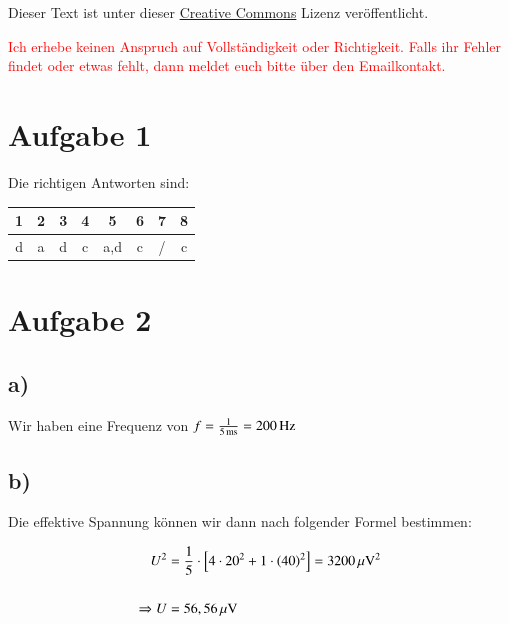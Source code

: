




\maketitle

Dieser Text ist unter dieser \href{http://creativecommons.org/licenses/by-nc-sa/4.0/}{Creative Commons} Lizenz veröffentlicht.

\textcolor{red}{Ich erhebe keinen Anspruch auf Vollständigkeit oder Richtigkeit. Falls ihr Fehler findet oder etwas fehlt, dann meldet euch bitte über den Emailkontakt.}

\tableofcontents


\newpage



\section{Aufgabe 1}

Die richtigen Antworten sind:


\begin{center}
	\begin{tabular}{c|c|c|c|c|c|c|c}
		1 & 2 & 3 & 4 & 5 & 6 & 7 & 8 \\ 
		\hline d & a & d & c & a,d & c & / & c \\  
	\end{tabular} 
\end{center}


\section{Aufgabe 2}

\subsection*{a)}

Wir haben eine Frequenz von $f = \frac{1}{\unit[5]{ms}} = \unit[200]{Hz}$

\subsection*{b)}

Die effektive Spannung können wir dann nach folgender Formel bestimmen:

\begin{align*}
	U^2 &= \frac{1}{5} \cdot \left[ 4 \cdot 20^2 + 1 \cdot \left( 40 \right)^2 \right] = \unit[3200]{\mu V^2} \\
	\hfill \\
	\Rightarrow U &= \unit[56,56]{\mu V}
\end{align*}


